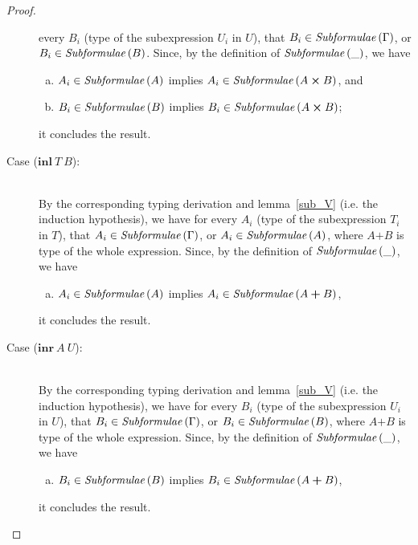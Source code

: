\documentclass[a4paper]{article}
\newcommand{\typprd}[2]{#1\boldsymbol{\times}#2}
\newcommand{\typsum}[2]{#1\boldsymbol{+}#2}
\newcommand{\explft}[2]{\mathbf{inl}\ #1\ #2}
\newcommand{\exprgt}[2]{\mathbf{inr}\ #1\ #2}
\newcommand{\txt}[1]{\text{\textit{#1}}}
\newcommand{\subformulae}[1]{\txt{Subformulae}\,(#1)}
\begin{document}
\begin{proof}
\begin{description}
  every $B_i$ (type of the subexpression $U_i$ in $U$), that $B_i \in
  \subformulae{\Gamma}$, or $B_i \in \subformulae{B}$. Since, by the
  definition of $\subformulae{\_}$, we have
  \begin{enumerate}[(a)] 
     \item $A_i \in \subformulae{A}$ implies $A_i \in \subformulae{\typprd{A}{B}}$, and
     \item $B_i \in \subformulae{B}$ implies $B_i \in \subformulae{\typprd{A}{B}}$;
  \end{enumerate}
  it concludes the result.
\item[Case ($\explft{T}{B}$):]\ \\
  By the corresponding typing derivation and lemma~\ref{sub_V}
  (i.e. the induction hypothesis), we have for every $A_i$ (type of
  the subexpression $T_i$ in $T$), that $A_i \in
  \subformulae{\Gamma}$, or $A_i \in \subformulae{A}$,
  where $\typsum{A}{B}$ is type of the whole expression.
  Since, by the definition of $\subformulae{\_}$, we have
  \begin{enumerate}[(a)] 
     \item $A_i \in \subformulae{A}$ implies $A_i \in \subformulae{\typsum{A}{B}}$,
  \end{enumerate}
  it concludes the result. 
\item[Case ($\exprgt{A}{U}$):]\ \\
  By the corresponding typing derivation and lemma~\ref{sub_V}
  (i.e. the induction hypothesis), we have for every $B_i$ (type of
  the subexpression $U_i$ in $U$), that $B_i \in
  \subformulae{\Gamma}$, or $B_i \in \subformulae{B}$,
  where $\typsum{A}{B}$ is type of the whole expression.
  Since, by the definition of $\subformulae{\_}$, we have
  \begin{enumerate}[(a)] 
     \item $B_i \in \subformulae{B}$ implies $B_i \in \subformulae{\typsum{A}{B}}$,
  \end{enumerate}
  it concludes the result.
\end{description}
\end{proof}
\end{document}
